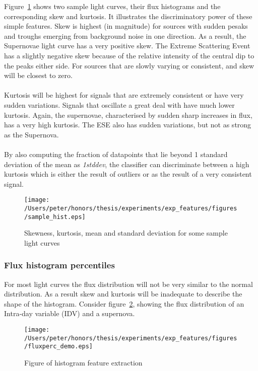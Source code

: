 	Figure~\ref{fig:samplestats} shows two sample light curves, their flux histograms and the corresponding skew and kurtosis.  It illustrates the discriminatory power of these simple features.
	Skew is highest (in magnitude) for sources with sudden pesaks and troughs emerging from background noise in one direction. As a result, the Supernovae light curve has a very positive skew. The Extreme Scattering Event has a slightly negative skew because of the relative intensity of the central dip to the peaks either side. For sources that are slowly varying or consistent, and skew will be closest to zero. \\ \\
	Kurtosis will be highest for signals that are extremely consistent or have very sudden variations. Signals that oscillate a great deal with have much lower kurtosis. Again, the supernovae, characterised by sudden sharp increases in flux, has a very high kurtosis. The ESE also has sudden variations, but not as strong as the Supernova. \\ \\
	By also computing the fraction of datapoints that lie beyond 1 standard deviation of the mean as \emph{1stddev}, the classifier can discriminate between a high kurtosis which is either the result of outliers or as the result of a very consistent signal.
		
	\begin{figure}[ht!]
		\label{fig:samplestats}
		\centering
		\texttt{[image: /Users/peter/honors/thesis/experiments/exp\_features/figures/sample\_hist.eps]}
		\caption{Skewness, kurtosis, mean and standard deviation for some sample light curves}
	\end{figure}
	
	
	
	\subsubsection{Flux histogram percentiles}
	For most light curves the flux distribution will not be very similar to the normal distribution. As a result skew and kurtosis will be inadequate to describe the shape of the histogram. Consider figure~\ref{fig:histograms}, showing the flux distribution of an Intra-day variable (IDV) and a supernova.  \\
	
	\begin{figure}[ht!]
		\centering
		\label{fig:histograms}
		\texttt{[image: /Users/peter/honors/thesis/experiments/exp\_features/figures/fluxperc\_demo.eps]}
		\caption{Figure of histogram feature extraction}
	\end{figure}
	
